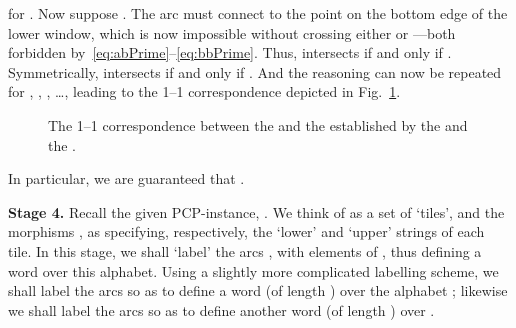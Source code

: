 \documentclass{article}
\begin{document}
for .  Now suppose .  The arc  must connect  to the point  on the bottom
edge of the lower window, which is now impossible without 
crossing either  or ---both forbidden
by~\eqref{eq:abPrime}--\eqref{eq:bbPrime}.  Thus,  intersects
 if and only if . Symmetrically,  intersects
 if and only if .  And the reasoning can now be
repeated for , , ,  \ldots, leading
to the 1--1 correspondence depicted in
Fig.~\ref{fig:arcCorrespondence}.
\begin{figure}
\caption{The 1--1 correspondence between the  and the
   established by the  and the .}
\label{fig:arcCorrespondence}
\end{figure}
In particular, we are guaranteed that .

\bigskip

\noindent
\textbf{Stage 4.}  Recall the given PCP-instance, .  We think of  as a set of `tiles', and the
morphisms ,  as specifying, respectively, the `lower'
and `upper' strings of each tile.  In this stage, we shall `label' the arcs
, with elements of , thus
defining a word  over this alphabet. Using a slightly more
complicated labelling scheme, we shall label the arcs  so as to define a word  (of length ) over the
alphabet ; likewise we shall label the arcs 
so as to define another word  (of length ) over .
\end{document}
